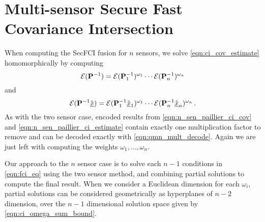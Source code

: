 \documentclass[letterpaper, 10 pt, conference]{ieeeconf}  %
\begin{document}
\section{Multi-sensor Secure Fast Covariance Intersection} \label{sec:multi_secfci}
When computing the SecFCI fusion for $n$ sensors, we solve \eqref{eqn:ci_cov_estimate} homomorphically by computing
\begin{equation}
   \mathcal{E}({{\mathbf{P}}}^{-1}) = \mathcal{E}({{\mathbf{P}}}^{-1}_1)^{\omega_1}\cdots\mathcal{E}({{\mathbf{P}}}^{-1}_{n})^{\omega_{n}} \label{eqn:n_sen_paillier_ci_cov}
\end{equation}
and
\begin{equation}
   \mathcal{E}({{\mathbf{P}}}^{-1}\hat{{\underline{x}}}) = \mathcal{E}({{\mathbf{P}}}^{-1}_1\hat{{\underline{x}}}_1)^{\omega_1}\cdots\mathcal{E}({{\mathbf{P}}}^{-1}_{n}\hat{{\underline{x}}}_{n})^{\omega_{n}}\,. \label{eqn:n_sen_paillier_ci_estimate}
\end{equation}
As with the two sensor case, encoded results from \eqref{eqn:n_sen_paillier_ci_cov} and \eqref{eqn:n_sen_paillier_ci_estimate} contain exactly one multiplication factor to remove and can be decoded exactly with \eqref{eqn:qmn_mult_decode}. Again we are just left with computing the weights $\omega_1,\dots,\omega_{n}$.

Our approach to the $n$ sensor case is to solve each $n-1$ conditions in \eqref{eqn:fci_eq} using the two sensor method, and combining partial solutions to compute the final result. When we consider a Euclidean dimension for each $\omega_i$, partial solutions can be considered geometrically as hyperplanes of $n-2$ dimension, over the $n-1$ dimensional solution space given by \eqref{eqn:ci_omega_sum_bound}. 
\end{document}

